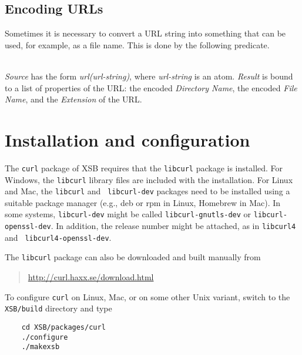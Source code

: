 \subsection{Encoding URLs}

Sometimes it is necessary to convert a URL string into something that can
be used, for example, as a file name. This is done by the following
predicate.

\begin{description}
\item[encode\_url({\it +Source, -Result})]\mbox{}
  \\
{\it Source} has the form {\it url(url-string)}, where
\emph{url-string} is an atom.
{\it Result} is bound to a list of properties of the URL:
the encoded {\it Directory Name}, the encoded {\it File Name}, and the {\it
  Extension} of the URL.

\end{description}



\section{Installation and configuration}

The {\tt curl} package of XSB requires that the {\tt libcurl} package is
installed.  For Windows, the {\tt libcurl} library files are included with
the installation. For Linux and Mac, the {\tt libcurl} and {\tt
  libcurl-dev} packages need to be installed using a suitable
package manager (e.g., deb or rpm in Linux, Homebrew in Mac). In some
systems, {\tt libcurl-dev} might be
called {\tt libcurl-gnutls-dev} or {\tt libcurl-openssl-dev}.  In addition,
the release number might be attached, as in {\tt libcurl4} and {\tt
  libcurl4-openssl-dev}.

The {\tt libcurl} package can also be downloaded and
built manually from
\begin{quote}
  \url{http://curl.haxx.se/download.html} 
\end{quote}
To configure {\tt curl} on Linux, Mac, or on some other Unix variant,
switch to the {\tt XSB/build} directory and type

\begin{verbatim}
    cd XSB/packages/curl
    ./configure
    ./makexsb
\end{verbatim}

